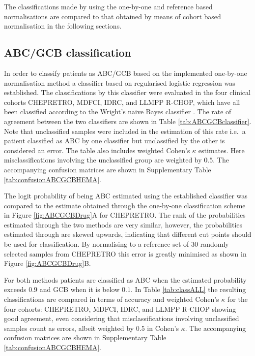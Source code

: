 \documentclass{article}
\begin{document}
The classifications made by \hemaClass{} using the one-by-one and reference based normalisations are compared to that obtained by means of cohort based normalisation in the following sections.


\subsection{ABC/GCB classification}
In order to classify patients as ABC/GCB based on the implemented one-by-one normalisation method a classifier based on regularised logistic regression was established.
The classifications by this classifier were evaluated in the four clinical cohorts CHEPRETRO, MDFCI, IDRC, and LLMPP R-CHOP, which have all been classified according to the Wright's naive Bayes classifier \citep{Wright2003,Lenz2008a}.
The rate of agreement between the two classifiers are shown in Table \ref{tab:ABCGCBclassifier}.
Note that unclassified samples were included in the estimation of this rate i.e.\ a patient classified as ABC by one classifier but unclassified by the other is considered an error.
The table also includes weighted Cohen's $\kappa$ estimates.
Here misclassifications involving the unclassified group are weighted by $0.5$.
The accompanying confusion matrices are shown in Supplementary Table \ref{tab:confusionABCGCBHEMA}.

The logit probability of being ABC estimated using the established classifier was compared to the estimate obtained through the one-by-one classification scheme in Figure \ref{fig:ABCGCBDrug}A for CHEPRETRO.
The rank of the probabilities estimated through the two methods are very similar, however, the probabilities estimated through \hemaClass{} are skewed upwards, indicating that different cut points should be used for classification.
By normalising to a reference set of $30$ randomly selected samples from CHEPRETRO this error is greatly minimised as shown in Figure \ref{fig:ABCGCBDrug}B.

For both methods patients are classified as ABC when the estimated probability exceeds $0.9$ and GCB when it is below $0.1$.
In Table \ref{tab:classALL} the resulting classifications are compared in terms of accuracy and weighted Cohen's $\kappa$ for the four cohorts: CHEPRETRO, MDFCI, IDRC, and LLMPP R-CHOP showing good agreement, even considering that misclassifications involving unclassified samples count as errors, albeit weighted by $0.5$ in Cohen's $\kappa$.
The accompanying confusion matrices are shown in Supplementary Table \ref{tab:confusionABCGCBHEMA}.
\end{document}
